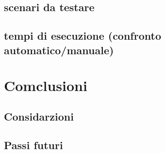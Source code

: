 \documentclass{article}
\begin{document}
\subsection{scenari da testare}
\subsection{tempi di esecuzione (confronto automatico/manuale)}

\section{Comclusioni}
\subsection{Considarzioni}
\subsection{Passi futuri}
\end{document}
